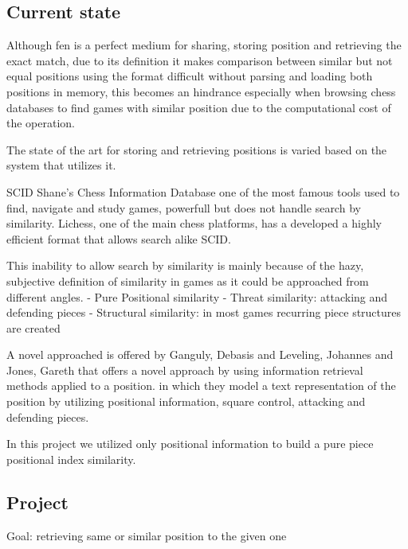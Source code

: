 
\subsection{Current state}
Although fen is a perfect medium for sharing, storing position and retrieving the exact match, 
due to its definition it makes comparison between similar but not equal positions using the format
difficult without parsing and loading both positions in memory, 
this becomes an hindrance especially when browsing chess databases to find games with similar position due to the computational cost of the operation.

The state of the art for storing and retrieving positions is varied based on the system that utilizes it.

SCID Shane's Chess Information Database one of the most famous tools used to find, navigate and study games, powerfull but does not handle search by similarity.
Lichess, one of the main chess platforms, has a developed a highly efficient format that allows search alike SCID.

This inability to allow search by similarity is mainly because of the hazy, subjective definition of similarity in games as it could be approached from different angles.
- Pure Positional similarity
- Threat similarity: attacking and defending pieces
- Structural similarity: in most games recurring piece structures are created

A novel approached is offered by Ganguly, Debasis and Leveling, Johannes and Jones, Gareth 
\cite{retrieval:soa:ids} that offers a novel approach by using information retrieval methods applied to a position.
in which they model a text representation of the position by utilizing positional information, square control, attacking and defending pieces.

In this project we utilized only positional information to build a pure piece positional index similarity.

\subsection{Project}
Goal: retrieving same or similar position to the given one


